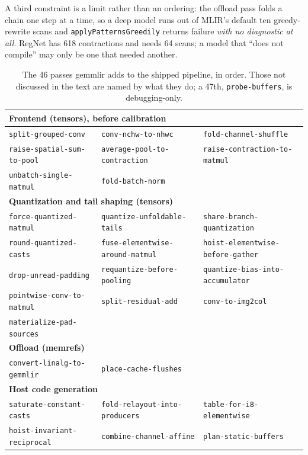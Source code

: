 \documentclass[runningheads]{llncs}
\begin{document}
A third constraint is a limit rather than an ordering: the offload pass folds a
chain one step at a time, so a deep model runs out of MLIR's default ten greedy-rewrite
scans and \texttt{applyPatternsGreedily} returns failure \emph{with no
diagnostic at all}. RegNet has 618 contractions and needs 64 scans; a model that
``does not compile'' may only be one that needed another.

\begin{table}[t]
\caption{The 46 passes gemmlir adds to the shipped pipeline, in order. Those not discussed in the text are named by what they do; a 47th, \texttt{probe-buffers}, is debugging-only.}\label{tab:passes}
\centering
\scriptsize
\begin{tabular}{|l|l|l|}
\hline
\multicolumn{3}{|l|}{\textbf{Frontend (tensors), before calibration}} \\
\hline
\texttt{split-grouped-conv} & \texttt{conv-nchw-to-nhwc} & \texttt{fold-channel-shuffle} \\
\texttt{raise-spatial-sum-to-pool} & \texttt{average-pool-to-contraction} & \texttt{raise-contraction-to-matmul} \\
\texttt{unbatch-single-matmul} & \texttt{fold-batch-norm} &  \\
\hline
\multicolumn{3}{|l|}{\textbf{Quantization and tail shaping (tensors)}} \\
\hline
\texttt{force-quantized-matmul} & \texttt{quantize-unfoldable-tails} & \texttt{share-branch-quantization} \\
\texttt{round-quantized-casts} & \texttt{fuse-elementwise-around-matmul} & \texttt{hoist-elementwise-before-gather} \\
\texttt{drop-unread-padding} & \texttt{requantize-before-pooling} & \texttt{quantize-bias-into-accumulator} \\
\texttt{pointwise-conv-to-matmul} & \texttt{split-residual-add} & \texttt{conv-to-img2col} \\
\texttt{materialize-pad-sources} &  &  \\
\hline
\multicolumn{3}{|l|}{\textbf{Offload (memrefs)}} \\
\hline
\texttt{convert-linalg-to-gemmlir} & \texttt{place-cache-flushes} &  \\
\hline
\multicolumn{3}{|l|}{\textbf{Host code generation}} \\
\hline
\texttt{saturate-constant-casts} & \texttt{fold-relayout-into-producers} & \texttt{table-for-i8-elementwise} \\
\texttt{hoist-invariant-reciprocal} & \texttt{combine-channel-affine} & \texttt{plan-static-buffers} \\

\end{tabular}
\end{table}
\end{document}
